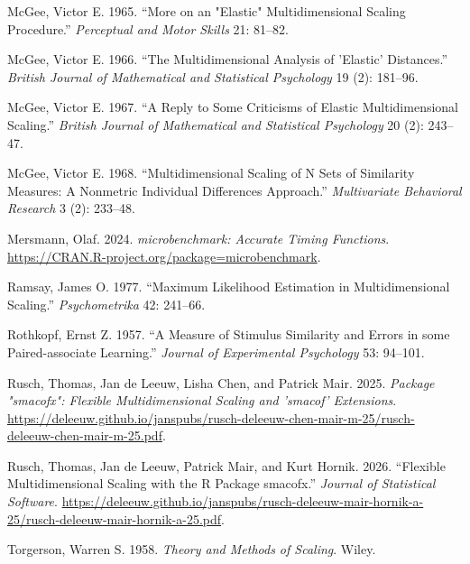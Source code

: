 \documentclass[
  12pt,
  letterpaper,
  DIV=11,
  numbers=noendperiod]{scrartcl}
\newlength{\cslhangindent}
\newenvironment{CSLReferences}[2] %
 {\begin{list}{}{%
  \setlength{\itemindent}{0pt}
  \setlength{\leftmargin}{0pt}
  \setlength{\parsep}{0pt}
  \ifodd #1
   \setlength{\leftmargin}{\cslhangindent}
   \setlength{\itemindent}{-1\cslhangindent}
  \fi
  \setlength{\itemsep}{#2\baselineskip}}}
 {\end{list}}
\begin{document}
\begin{CSLReferences}{1}{1}
McGee, Victor E. 1965. {``More on an "Elastic" Multidimensional Scaling
Procedure.''} \emph{Perceptual and Motor Skills} 21: 81--82.

McGee, Victor E. 1966. {``The Multidimensional Analysis of 'Elastic'
Distances.''} \emph{British Journal of Mathematical and Statistical
Psychology} 19 (2): 181--96.

McGee, Victor E. 1967. {``A Reply to Some Criticisms of Elastic
Multidimensional Scaling.''} \emph{British Journal of Mathematical and
Statistical Psychology} 20 (2): 243--47.

McGee, Victor E. 1968. {``{Multidimensional Scaling of N Sets of
Similarity Measures: A Nonmetric Individual Differences Approach}.''}
\emph{Multivariate Behavioral Research} 3 (2): 233--48.

Mersmann, Olaf. 2024. \emph{{microbenchmark: Accurate Timing
Functions}}. \url{https://CRAN.R-project.org/package=microbenchmark}.

Ramsay, James O. 1977. {``{Maximum Likelihood Estimation in
Multidimensional Scaling}.''} \emph{Psychometrika} 42: 241--66.

Rothkopf, Ernst Z. 1957. {``{A Measure of Stimulus Similarity and Errors
in some Paired-associate Learning}.''} \emph{Journal of Experimental
Psychology} 53: 94--101.

{Rusch, Thomas, Jan de Leeuw, Lisha Chen, and Patrick Mair}. 2025.
\emph{{Package "smacofx": Flexible Multidimensional Scaling and 'smacof'
Extensions}}.
\url{https://deleeuw.github.io/janspubs/rusch-deleeuw-chen-mair-m-25/rusch-deleeuw-chen-mair-m-25.pdf}.

{Rusch, Thomas, Jan de Leeuw, Patrick Mair, and Kurt Hornik}. 2026.
{``{Flexible Multidimensional Scaling with the R Package smacofx}.''}
\emph{Journal of Statistical Software}.
\url{https://deleeuw.github.io/janspubs/rusch-deleeuw-mair-hornik-a-25/rusch-deleeuw-mair-hornik-a-25.pdf}.

Torgerson, Warren S. 1958. \emph{{Theory and Methods of Scaling}}.
Wiley.

\end{CSLReferences}
\end{document}
